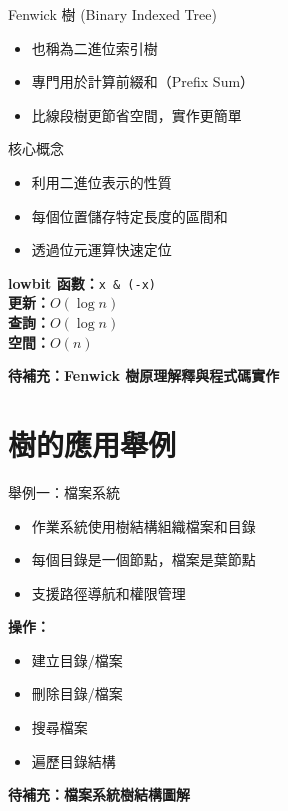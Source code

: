 \documentclass{beamer}
\begin{document}
\begin{frame}{Fenwick 樹 (Binary Indexed Tree)}
\begin{itemize}
    \item 也稱為二進位索引樹
    \item 專門用於計算前綴和（Prefix Sum）
    \item 比線段樹更節省空間，實作更簡單
\end{itemize}

\vspace{1em}
\begin{block}{核心概念}
\begin{itemize}
    \item 利用二進位表示的性質
    \item 每個位置儲存特定長度的區間和
    \item 透過位元運算快速定位
\end{itemize}
\end{block}

\vspace{1em}
\textbf{lowbit 函數：}\texttt{x \& (-x)}\\
\textbf{更新：}$O(\log n)$\\
\textbf{查詢：}$O(\log n)$\\
\textbf{空間：}$O(n)$

\vspace{1em}
\textbf{待補充：Fenwick 樹原理解釋與程式碼實作}
\end{frame}

\section{樹的應用舉例}

\begin{frame}{舉例一：檔案系統}
\begin{itemize}
    \item 作業系統使用樹結構組織檔案和目錄
    \item 每個目錄是一個節點，檔案是葉節點
    \item 支援路徑導航和權限管理
\end{itemize}

\vspace{1em}
\textbf{操作：}
\begin{itemize}
    \item 建立目錄/檔案
    \item 刪除目錄/檔案
    \item 搜尋檔案
    \item 遍歷目錄結構
\end{itemize}

\vspace{1em}
\textbf{待補充：檔案系統樹結構圖解}
\end{frame}
\end{document}

